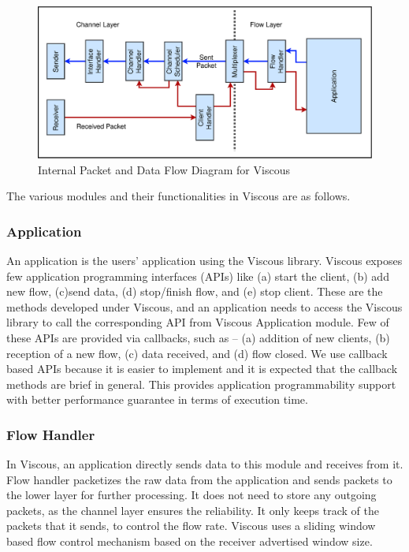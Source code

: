 \begin{figure}[!ht]
    \centering
    \includegraphics[width=.8\linewidth]{img/ModularDiagram}
    \caption{Internal Packet and Data Flow Diagram for Viscous}
    \label{fig:ModularDiagram}
\end{figure}

The various modules and their functionalities in Viscous are as follows. 

\subsubsection{Application}
An application is the users' application using the Viscous library. Viscous exposes few application programming interfaces (APIs) like (a) start the client, (b) add new flow, (c)send data, (d) stop/finish flow, and (e) stop client. These are the methods developed under Viscous, and an application needs to access the Viscous library to call the corresponding API from Viscous Application module. Few of these APIs are provided via callbacks, such as -- (a) addition of new clients, (b) reception of a new flow, (c) data received, and (d) flow closed. We use callback based APIs because it is easier to implement and it is expected that the callback methods are brief in general. This provides application programmability support with better performance guarantee in terms of execution time. 


\subsubsection{Flow Handler}
In Viscous, an application directly sends data to this module and receives from it. Flow handler packetizes the raw data from the application and sends packets to the lower layer for further processing. It does not need to store any outgoing packets, as the channel layer ensures the reliability. It only keeps track of the packets that it sends, to control the flow rate. Viscous uses a sliding window based flow control mechanism based on the receiver advertised window size. 


